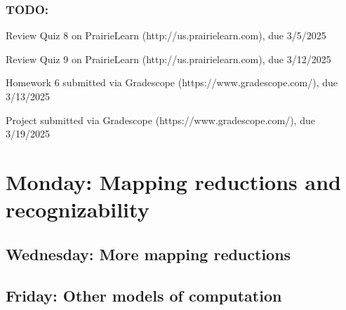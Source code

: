 \vspace{-20pt}

\subsubsection*{TODO:}
\begin{list}{\itemsep-10pt}
   \item Review Quiz 8 on PrairieLearn (http://us.prairielearn.com), due 3/5/2025
   \item Review Quiz 9 on PrairieLearn (http://us.prairielearn.com), due 3/12/2025
   \item Homework 6 submitted via Gradescope (https://www.gradescope.com/), due 3/13/2025
   \item Project submitted via Gradescope (https://www.gradescope.com/), due 3/19/2025
\end{list}

\newpage

\section*{Monday: Mapping reductions and recognizability}


    
\newpage
\subsection*{Wednesday: More mapping reductions}




\vfill
\subsection*{Friday: Other models of computation}


